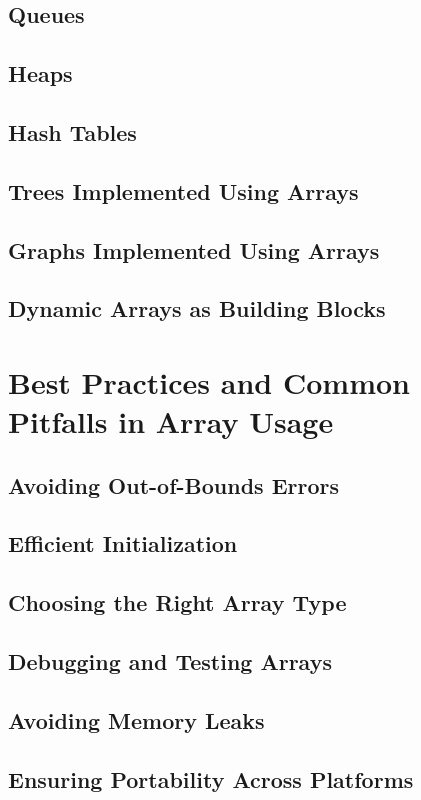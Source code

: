 \documentclass[12pt, oneside]{book}
\begin{document}
	\section{Queues}
	\section{Heaps}
	\section{Hash Tables}
	\section{Trees Implemented Using Arrays}
	\section{Graphs Implemented Using Arrays}
	\section{Dynamic Arrays as Building Blocks}
	
	\chapter{Best Practices and Common Pitfalls in Array Usage}
	\section{Avoiding Out-of-Bounds Errors}
	\section{Efficient Initialization}
	\section{Choosing the Right Array Type}
	\section{Debugging and Testing Arrays}
	\section{Avoiding Memory Leaks}
	\section{Ensuring Portability Across Platforms}
	
\end{document}
